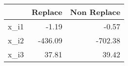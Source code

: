 \begin{tabular}{rrr}
  \hline
 & Replace & Non Replace \\ 
  \hline
x\_i1 & -1.19 & -0.57 \\ 
  x\_i2 & -436.09 & -702.38 \\ 
  x\_i3 & 37.81 & 39.42 \\ 
   \hline
\end{tabular}
